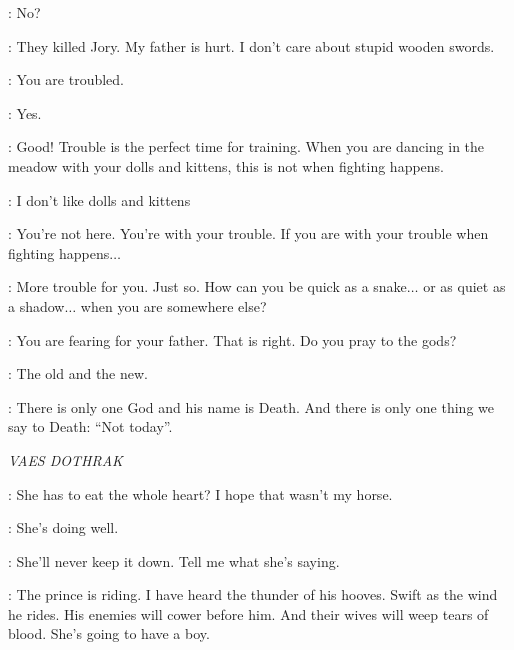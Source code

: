 \SYRIO: No? 

\ARYA: They killed Jory. My father is hurt. I don't care about stupid wooden swords. 

\SYRIO: You are troubled. 

\ARYA: Yes. 

\SYRIO: Good! Trouble is the perfect time for training. When you are dancing in the meadow with your dolls and kittens, this is not when fighting happens. 

\ARYA: I don't like dolls and kittens


\SYRIO: You're not here. You're with your trouble. If you are with your trouble when fighting happens$\ldots$ 


\SYRIO: More trouble for you. Just so. How can you be quick as a snake$\ldots$ or as quiet as a shadow$\ldots$ when you are somewhere else?


\SYRIO: You are fearing for your father. That is right. Do you pray to the gods? 

\ARYA: The old and the new. 

\SYRIO: There is only one God and his name is Death. And there is only one thing we say to Death: ``Not today''. 



\scene

\textit{VAES DOTHRAK} 


\VISERYS: She has to eat the whole heart? I hope that wasn't my horse. 


\JORAH: She's doing well. 

\VISERYS: She'll never keep it down.  Tell me what she's saying. 

\JORAH: The prince is riding. I have heard the thunder of his hooves. Swift as the wind he rides. His enemies will cower before him. And their wives will weep tears of blood. She's going to have a boy. 

